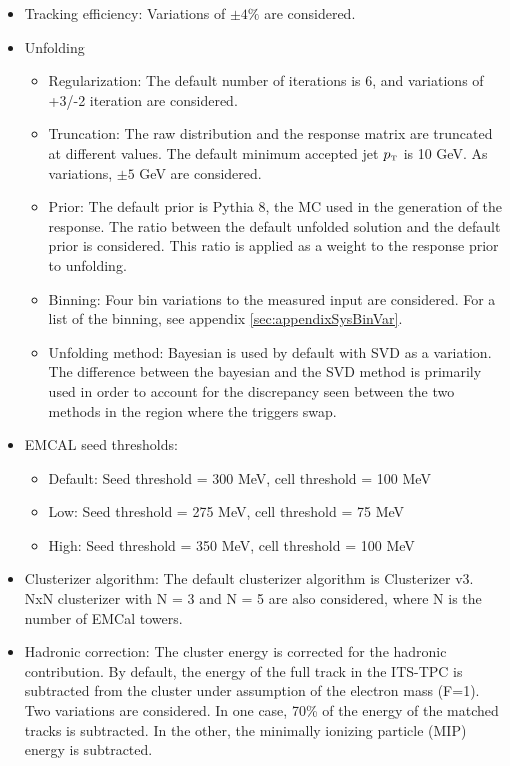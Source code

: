 \documentclass[ALICE]{ALICE_analysis_notes}
\newcommand{\pT}{$p_{\mbox{\tiny T}}$\xspace}
\begin{document}
\begin{itemize}
    \item Tracking efficiency: Variations of $\pm 4\%$ are considered.
    
    \item Unfolding
    \begin{itemize}
        \item Regularization: The default number of iterations is 6, and variations of +3/-2 iteration are considered.
        \item Truncation: The raw distribution and the response matrix are truncated at different values. The default minimum accepted jet \pT is 10 GeV. As variations, $\pm 5$ GeV are considered.
        \item Prior: The default prior is Pythia 8, the MC used in the generation of the response. The ratio between the default unfolded solution and the default prior is considered. This ratio is applied as a weight to the response prior to unfolding.
        \item Binning: Four bin variations to the measured input are considered. For a list of the binning, see appendix \ref{sec:appendixSysBinVar}.
        \item Unfolding method: Bayesian is used by default with SVD as a variation. The difference between the bayesian and the SVD method is primarily used in order to account for the discrepancy seen between the two methods in the region where the triggers swap.
    \end{itemize}

    \item EMCAL seed thresholds:
    \begin{itemize}
        \item Default: Seed threshold = 300 MeV, cell threshold = 100 MeV
        \item Low: Seed threshold = 275 MeV, cell threshold = 75 MeV
        \item High: Seed threshold = 350 MeV, cell threshold = 100 MeV
    \end{itemize}
    
    \item Clusterizer algorithm: The default clusterizer algorithm is Clusterizer v3. NxN clusterizer with N = 3 and N = 5 are also considered, where N is the number of EMCal towers.
    
    \item Hadronic correction: The cluster energy is corrected for the hadronic contribution. By default, the energy of the full track in the ITS-TPC is subtracted from the cluster under assumption of the electron mass (F=1). Two variations are considered. In one case, 70\% of the energy of the matched tracks is subtracted. In the other, the minimally ionizing particle (MIP) energy is subtracted.
    

\end{itemize}
\end{document}
